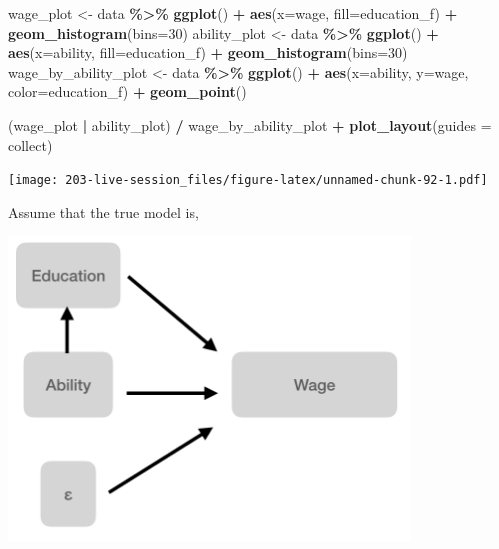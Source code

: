 \documentclass[
]{book}
\newenvironment{Shaded}{\begin{snugshade}}{\end{snugshade}}
\newcommand{\AttributeTok}[1]{\textcolor[rgb]{0.13,0.29,0.53}{#1}}
\newcommand{\DecValTok}[1]{\textcolor[rgb]{0.00,0.00,0.81}{#1}}
\newcommand{\FunctionTok}[1]{\textcolor[rgb]{0.13,0.29,0.53}{\textbf{#1}}}
\newcommand{\NormalTok}[1]{#1}
\newcommand{\OtherTok}[1]{\textcolor[rgb]{0.56,0.35,0.01}{#1}}
\newcommand{\SpecialCharTok}[1]{\textcolor[rgb]{0.81,0.36,0.00}{\textbf{#1}}}
\newcommand{\StringTok}[1]{\textcolor[rgb]{0.31,0.60,0.02}{#1}}
\theoremstyle{definition}
\theoremstyle{definition}
\theoremstyle{definition}
\theoremstyle{definition}
\theoremstyle{remark}
\begin{document}
\begin{Shaded}
\begin{Highlighting}[]
\NormalTok{wage\_plot }\OtherTok{\textless{}{-}}\NormalTok{ data }\SpecialCharTok{\%\textgreater{}\%} 
  \FunctionTok{ggplot}\NormalTok{() }\SpecialCharTok{+} 
  \FunctionTok{aes}\NormalTok{(}\AttributeTok{x=}\NormalTok{wage, }\AttributeTok{fill=}\NormalTok{education\_f) }\SpecialCharTok{+} 
  \FunctionTok{geom\_histogram}\NormalTok{(}\AttributeTok{bins=}\DecValTok{30}\NormalTok{)}
\NormalTok{ability\_plot }\OtherTok{\textless{}{-}}\NormalTok{ data }\SpecialCharTok{\%\textgreater{}\%} 
  \FunctionTok{ggplot}\NormalTok{() }\SpecialCharTok{+} 
  \FunctionTok{aes}\NormalTok{(}\AttributeTok{x=}\NormalTok{ability, }\AttributeTok{fill=}\NormalTok{education\_f) }\SpecialCharTok{+} 
  \FunctionTok{geom\_histogram}\NormalTok{(}\AttributeTok{bins=}\DecValTok{30}\NormalTok{)}
\NormalTok{wage\_by\_ability\_plot }\OtherTok{\textless{}{-}}\NormalTok{ data }\SpecialCharTok{\%\textgreater{}\%} 
  \FunctionTok{ggplot}\NormalTok{() }\SpecialCharTok{+} 
  \FunctionTok{aes}\NormalTok{(}\AttributeTok{x=}\NormalTok{ability, }\AttributeTok{y=}\NormalTok{wage, }\AttributeTok{color=}\NormalTok{education\_f) }\SpecialCharTok{+} 
  \FunctionTok{geom\_point}\NormalTok{()}
  

\NormalTok{(wage\_plot }\SpecialCharTok{|}\NormalTok{ ability\_plot) }\SpecialCharTok{/} 
\NormalTok{  wage\_by\_ability\_plot }\SpecialCharTok{+} 
  \FunctionTok{plot\_layout}\NormalTok{(}\AttributeTok{guides =} \StringTok{\textquotesingle{}collect\textquotesingle{}}\NormalTok{)}
\end{Highlighting}
\end{Shaded}

\texttt{[image: 203-live-session\_files/figure-latex/unnamed-chunk-92-1.pdf]}

Assume that the true model is,

\includegraphics[width=0.8\textwidth,height=\textheight]{images/wage_system.png}
\end{document}

